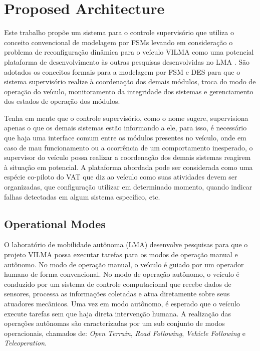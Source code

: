 \documentclass[conference]{IEEEtran}
\begin{document}
\section{Proposed Architecture}\label{sec:proposed_architec}

Este trabalho propõe um sistema para o controle supervisório que utiliza o conceito convencional de modelagem por FSMs levando em consideração o problema de reconfiguração dinâmica para o veículo VILMA como uma potencial plataforma de desenvolvimento às outras pesquisas desenvolvidas no LMA \cite{lma_vilma_website}. São adotados os conceitos formais para a modelagem por FSM e DES para que o sistema supervisório realize à coordenação dos demais módulos, troca do modo de operação do veículo, monitoramento da integridade dos sistemas e gerenciamento dos estados de operação dos módulos. 

Tenha em mente que o controle supervisório, como o nome sugere, supervisiona apenas o que os demais sistemas estão informando a ele, para isso, é necessário que haja  uma interface comum entre os módulos presentes no veículo, onde em caso de mau funcionamento ou a ocorrência de um comportamento inesperado, o supervisor do veículo possa realizar a coordenação dos demais sistemas reagirem à situação em potencial. A plataforma abordada pode ser considerada como uma espécie co-piloto do VAT que diz ao veículo como suas atividades devem ser organizadas, que configuração utilizar em determinado momento, quando indicar falhas detectadas em algum sistema específico, etc.  

%
\subsection{Operational Modes}\label{subsec:operational_modes}
O laboratório de mobilidade autônoma (LMA) desenvolve pesquisas para que o projeto VILMA possa executar tarefas para os modos de operação manual e autônomo. No modo de operação manual, o veículo é guiado por um operador humano de forma convencional. No modo de operação autônomo, o veículo é conduzido por um sistema de controle computacional que recebe dados de sensores, processa as informações coletadas e atua diretamente sobre seus atuadores mecânicos. Uma vez em modo autônomo, é esperado que o veículo execute tarefas sem que haja direta intervenção humana. A realização das operações autônomas são caracterizadas por um sub conjunto de modos operacionais, chamados de: \textit{Open Terrain}, \textit{Road Following}, \textit{Vehicle Following} e \textit{Teleoperation}.
\end{document}
